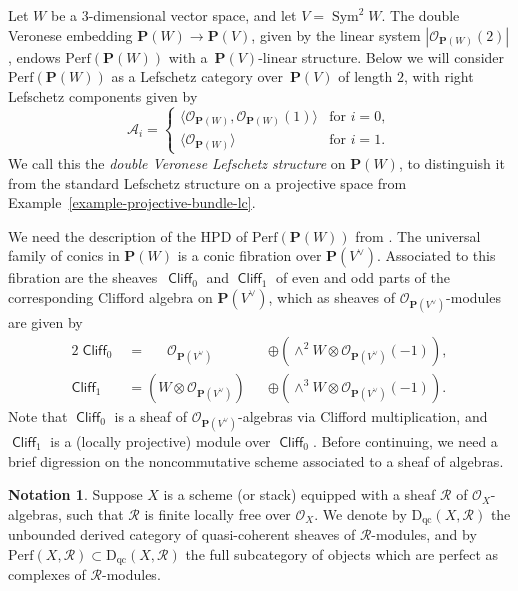 \documentclass[11pt, reqno]{amsart}
\numberwithin{equation}{section}
\theoremstyle{plain}
\theoremstyle{definition}
\newtheorem{notation}[theorem]{Notation}
\newcommand{\Perf}{\mathrm{Perf}}
\newcommand{\svee}{\scriptscriptstyle\vee}
\newcommand{\QCoh}{\mathrm{D_{qc}}}
\DeclareMathOperator{\Sym}{Sym}
\DeclareMathOperator{\Cl}{\mathsf{Cliff}}
\newcommand{\vV}{V^{\svee}}
\newcommand{\cO}{\mathcal{O}}
\newcommand{\cA}{\mathcal{A}}
\newcommand{\cR}{\mathcal{R}}
\newcommand{\bP}{\mathbf{P}}
\begin{document}
Let $W$ be a $3$-dimensional vector space, and let $V = \Sym^2W$. 
The double Veronese embedding $\bP(W) \to \bP(V)$, given by the linear system $|\cO_{\bP(W)}(2)|$, 
endows $\Perf(\bP(W))$ with a~$\bP(V)$-linear structure. 
Below we will consider $\Perf(\bP(W))$ as a Lefschetz category over~$\bP(V)$ of length $2$, 
with right Lefschetz components given by 
\begin{equation*}
\cA_i = \begin{cases}
\langle \cO_{\bP(W)}, \cO_{\bP(W)}(1) \rangle & \text{for $i = 0$} , \\ 
\langle \cO_{\bP(W)} \rangle & \text{for $i = 1$} .
\end{cases}
\end{equation*}
We call this the \emph{double Veronese Lefschetz structure} on $\bP(W)$, 
to distinguish it from the standard Lefschetz structure on a projective space 
from Example~\ref{example-projective-bundle-lc}. 

We need the description of the HPD of $\Perf(\bP(W))$ from \cite{kuznetsov08quadrics}. 
The universal family of conics in $\bP(W)$ is a conic fibration over $\bP(\vV)$. 
Associated to this fibration are the sheaves~$\Cl_0$ and $\Cl_1$ of even and odd parts of the corresponding  
Clifford algebra on $\bP(\vV)$, which as sheaves of $\cO_{\bP(\vV)}$-modules are given by 
\begin{alignat}{2}
\Cl_0 & = \hspace{18pt} \cO_{\bP(\vV)} && \oplus \left(\wedge^2W \otimes \cO_{\bP(\vV)}(-1) \right) , \\ 
\Cl_1 & = \left(W \otimes \cO_{\bP(\vV)} \right) && \oplus \left(\wedge^3W \otimes \cO_{\bP(\vV)}(-1) \right)  . 
\end{alignat}
Note that $\Cl_0$ is a sheaf of $\cO_{\bP(\vV)}$-algebras via Clifford multiplication,  
and $\Cl_1$ is a (locally projective) module over $\Cl_0$. 
Before continuing, we need a brief digression on the noncommutative scheme 
associated to a sheaf of algebras. 

\begin{notation}
\label{notation-sheaves-algebras}
Suppose $X$ is a scheme (or stack) equipped with a sheaf $\cR$ 
of $\cO_{X}$-algebras, such that 
$\cR$ is finite locally free over $\cO_{X}$. 
We denote by $\QCoh(X, \cR)$ the unbounded derived category of quasi-coherent sheaves of $\cR$-modules, and 
by $\Perf(X, \cR) \subset \QCoh(X, \cR)$ the full subcategory of objects which are perfect as complexes of $\cR$-modules. 
\end{notation} 
\end{document}
